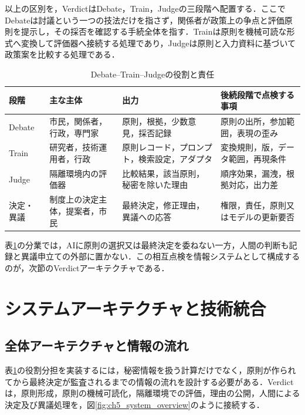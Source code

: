 以上の区別を，VerdictはDebate，Train，Judgeの三段階へ配置する．ここでDebateは討議という一つの技法だけを指さず，関係者が政策上の争点と評価原則を提示し，その採否を確認する手続全体を指す．Trainは原則を機械可読な形式へ変換して評価器へ接続する処理であり，Judgeは原則と入力資料に基づいて政策案を比較する処理である．

\begin{table}[htb]
\caption{Debate--Train--Judgeの役割と責任}
\label{tab:ch7_dtj_roles}
\centering
\small
\begin{tabularx}{\columnwidth}{p{}p{}p{}X}
\toprule
段階 & 主な主体 & 出力 & 後続段階で点検する事項 \\
\midrule
Debate & 市民，関係者，行政，専門家 & 原則，根拠，少数意見，採否記録 & 原則の出所，参加範囲，表現の歪み \\
Train & 研究者，技術運用者，行政 & 原則レコード，プロンプト，検索設定，アダプタ & 変換規則，版，データ範囲，再現条件 \\
Judge & 隔離環境内の評価器 & 比較結果，該当原則，秘密を除いた理由 & 順序効果，漏洩，根拠対応，出力差 \\
決定・異議 & 制度上の決定主体，提案者，市民 & 最終決定，修正理由，異議への応答 & 権限，責任，原則又はモデルの更新要否 \\
\bottomrule
\end{tabularx}
\end{table}

表\ref{tab:ch7_dtj_roles}の分業では，AIに原則の選択又は最終決定を委ねない一方，人間の判断も記録と異議申立ての外部に置かない．この相互点検を情報システムとして構成するのが，次節のVerdictアーキテクチャである．

\section{システムアーキテクチャと技術統合}

\subsection{全体アーキテクチャと情報の流れ}

表\ref{tab:ch7_dtj_roles}の役割分担を実装するには，秘密情報を扱う計算だけでなく，原則が作られてから最終決定が監査されるまでの情報の流れを設計する必要がある．Verdictは，原則形成，原則の機械可読化，隔離環境での評価，理由の公開，人間による決定及び異議処理を，図\ref{fig:ch5_system_overview}のように接続する．

